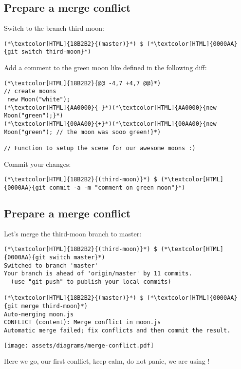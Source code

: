 \subsection{Prepare a merge conflict}
\begin{frame}[fragile]
  \subslidetitle

  Switch to the branch third-moon:
  \begin{lstlisting}
(*\textcolor[HTML]{18B2B2}{(master)}*) $ (*\textcolor[HTML]{0000AA}{git switch third-moon}*)
\end{lstlisting}

  Add a comment to the green moon like defined in the following diff:
  \begin{lstlisting}
(*\textcolor[HTML]{18B2B2}{@@ -4,7 +4,7 @@}*)
// create moons
 new Moon("white");
(*\textcolor[HTML]{AA0000}{-}*)(*\textcolor[HTML]{AA0000}{new Moon("green");}*)
(*\textcolor[HTML]{00AA00}{+}*)(*\textcolor[HTML]{00AA00}{new Moon("green"); // the moon was sooo green!}*)

// Function to setup the scene for our awesome moons :)
\end{lstlisting}

  Commit your changes:
  \begin{lstlisting}
(*\textcolor[HTML]{18B2B2}{(third-moon)}*) $ (*\textcolor[HTML]{0000AA}{git commit -a -m "comment on green moon"}*)
\end{lstlisting}
\end{frame}

\subsection{Prepare a merge conflict}
\begin{frame}[fragile]
  \subslidetitle

  Let's merge the third-moon branch to master:
  \begin{lstlisting}
(*\textcolor[HTML]{18B2B2}{(third-moon)}*) $ (*\textcolor[HTML]{0000AA}{git switch master}*)
Switched to branch 'master'
Your branch is ahead of 'origin/master' by 11 commits.
  (use "git push" to publish your local commits)

(*\textcolor[HTML]{18B2B2}{(master)}*) $ (*\textcolor[HTML]{0000AA}{git merge third-moon}*)
Auto-merging moon.js
CONFLICT (content): Merge conflict in moon.js
Automatic merge failed; fix conflicts and then commit the result.
\end{lstlisting}
  \centerline{\texttt{[image: assets/diagrams/merge-conflict.pdf]}}
  \vspace{0.5em}
  Here we go, our first conflict, keep calm, do not panic, we are using !
\end{frame}

